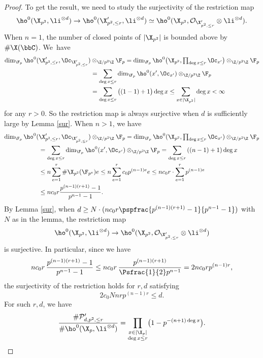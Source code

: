 \begin{proof}
To get the result, we need to study the surjectivity of the restriction map\vspace*{-3pt}
\[
\ho^0(\X_{p^2}, \li^{\otimes d})\to \ho^0(\X'_{p^2,\leq r}, \li^{\otimes d})\simeq\ho^0(\X_{p^2}, \mathcal{O}_{\X'_{p^2,\leq r}}\otimes \li^{\otimes d}).
\]
When $n=1$, the number of closed points of $|\X_{p^2}|$ is bounded above by $\#\X(\bbC)$. We~have\vspace*{-3pt}
\begin{align*}
\dim_{\F_p}\ho^0(\X'_{p^2,\leq r}, \Oc_{\X'_{p^2,\leq r}})&\otimes_{\Z/p^2\Z} \F_p =\dim_{\F_p}\ho^0\bigl(\X_{p^2}, \textstyle\prod_{\deg x\leq r}\Oc_{x'}\bigr)\otimes_{\Z/p^2\Z} \F_p\\
&= \sum_{\deg x\leq r}\dim_{\F_p}\ho^0(x', \Oc_{x'})\otimes_{\Z/p^2\Z} \F_p\\
&= \sum_{\deg x\leq r} {\big((1-1)+1\big)\deg x}\leq \sum_{x\in |\X_{p^2}|}\deg x<\infty
\end{align*}
for any $r>0$. So the restriction map is always surjective when $d$ is sufficiently large by Lemma \ref{sur}.
When $n>1$, we have\vspace*{-3pt}
\begin{align*}
\dim_{\F_p}\ho^0(&\X'_{p^2,\leq r}, \Oc_{\X'_{p^2,\leq r}})\otimes_{\Z/p^2\Z} \F_p =\dim_{\F_p}\ho^0(\X_{p^2}, \textstyle\prod_{\deg x\leq r}\Oc_{x'})\otimes_{\Z/p^2\Z} \F_p\\
&= \sum_{\deg x\leq r}\dim_{\F_p}\ho^0(x', \Oc_{x'})\otimes_{\Z/p^2\Z} \F_p= \sum_{\deg x\leq r} {((n-1)+1)\deg x}\\
&\leq n \sum_{e=1}^r \#\X_{p^2}(\F_{p^e})e\leq n \sum_{e=1}^r c_0p^{(n-1)e}e\leq n c_0r\cdot \sum_{e=1}^r p^{(n-1)e}\\
&\leq n c_0r \frac{p^{(n-1)(r+1)}-1}{p^{n-1}-1}.
\end{align*}
By Lemma \ref{sur}, when $d\geq N\cdot(n c_0r\pspfrac{p^{(n-1)(r+1)}-1}{p^{n-1}-1})$ with $N$ as in the lemma, the restriction map\vspace*{-3pt}
\[
\ho^0(\X_{p^2}, \li^{\otimes d})\to \ho^0(\X_{p^2}, \mathcal{O}_{\X'_{p^2,\leq r}}\otimes \li^{\otimes d})
\]
is surjective. In particular, since we have%
\[
n c_0r\, \frac{p^{(n-1)(r+1)}-1}{p^{n-1}-1}\leq nc_0r\,\frac{p^{(n-1)(r+1)}}{\Psfrac{1}{2}p^{n-1}}=2nc_0rp^{(n-1)r},
\]
the surjectivity of the restriction holds for $r,d$ satisfying\vspace*{-3pt}
\[
2c_0Nnrp^{(n-1)r}\leq d.
\]
For such $r,d$, we have\vspace*{-3pt}
\[
\frac{\#\mathcal{P}'_{d,p^2,\leq r}}{\#\ho^0(\X_{p}, \li^{\otimes d})}=\prod_{\substack{x\in |\X_{p}|\\ \deg x\leq r}} \bigl(1-p^{-(n+1)\deg x} \bigr).\qedhere
\]
\end{proof}

